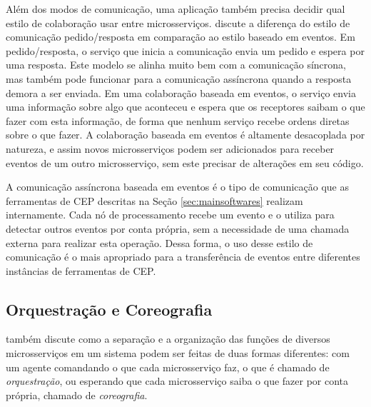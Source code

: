 Além dos modos de comunicação, uma aplicação também precisa decidir qual estilo de colaboração usar entre microsserviços.
\cite{martinfowler} discute a diferença do estilo de comunicação pedido/resposta em comparação ao estilo baseado em eventos.
Em pedido/resposta, o serviço que inicia a comunicação envia um pedido e espera por uma resposta. Este modelo se alinha muito bem com a comunicação síncrona, mas também pode funcionar para a comunicação assíncrona quando a resposta demora a ser enviada. Em uma colaboração baseada em eventos, o serviço envia uma informação sobre algo que aconteceu e espera que os receptores saibam o que fazer com esta informação, de forma que nenhum serviço recebe ordens diretas sobre o que fazer. A colaboração baseada em eventos é altamente desacoplada por natureza, e assim novos microsserviços podem ser adicionados para receber eventos de um outro microsserviço, sem este precisar de alterações em seu código. 

A comunicação assíncrona baseada em eventos é o tipo de comunicação que as ferramentas de CEP descritas na Seção \ref{sec:mainsoftwares} realizam internamente. Cada nó de processamento recebe um evento e o utiliza para detectar outros eventos por conta própria, sem a necessidade de uma chamada externa para realizar esta operação. Dessa forma, o uso desse estilo de comunicação é o mais apropriado para a transferência de eventos entre diferentes instâncias de ferramentas de CEP.



\subsection{Orquestração e Coreografia}
\label{sec:orquestrationvscoreography}

\cite{Newman:2015:BM:2904388} também discute como a separação e a organização das funções 
de diversos microsserviços em um sistema podem ser feitas de duas formas diferentes: com um agente comandando o que cada microsserviço faz, o que é chamado de \textit{orquestração}, ou esperando que cada microsserviço saiba o que fazer por conta própria, chamado de \textit{coreografia}. 

